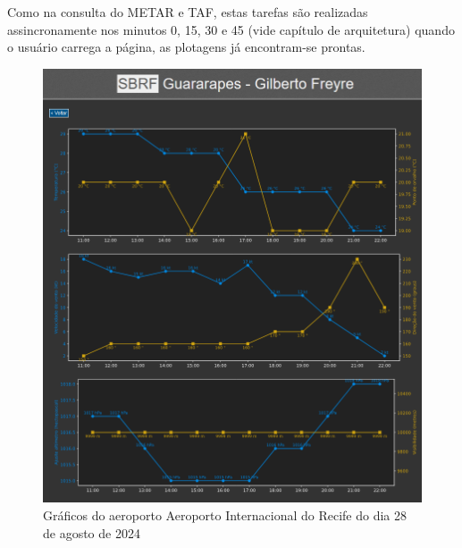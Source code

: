 Como na consulta do METAR e TAF, estas tarefas são realizadas assincronamente nos minutos 0, 15, 30 e 45 (vide capítulo
de arquitetura) quando o usuário carrega a página, as plotagens já encontram-se prontas.

\begin{figure}[ht]
    \begin{center}
    \includegraphics[width=400pt]{img/plots-SBRF.png}
    \caption{Gráficos do aeroporto Aeroporto Internacional do Recife do dia 28 de agosto de 2024}
    \label{fig:sbrf-plot}
    \end{center}
\end{figure}